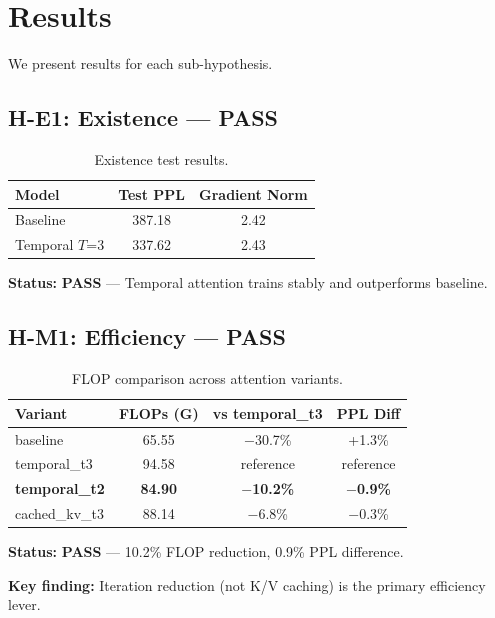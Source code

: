 \section{Results}
\label{sec:results}

We present results for each sub-hypothesis.

\subsection{H-E1: Existence --- PASS}

\begin{table}[h]
\centering
\begin{tabular}{@{}lcc@{}}
\toprule
\textbf{Model} & \textbf{Test PPL} & \textbf{Gradient Norm} \\
\midrule
Baseline & 387.18 & 2.42 \\
Temporal $T$=3 & 337.62 & 2.43 \\
\bottomrule
\end{tabular}
\caption{Existence test results.}
\label{tab:existence}
\end{table}

\textbf{Status:} \textbf{PASS} --- Temporal attention trains stably and outperforms baseline.

\subsection{H-M1: Efficiency --- PASS}

\begin{table}[h]
\centering
\begin{tabular}{@{}lccc@{}}
\toprule
\textbf{Variant} & \textbf{FLOPs (G)} & \textbf{vs temporal\_t3} & \textbf{PPL Diff} \\
\midrule
baseline & 65.55 & $-$30.7\% & +1.3\% \\
temporal\_t3 & 94.58 & reference & reference \\
\textbf{temporal\_t2} & \textbf{84.90} & \textbf{$-$10.2\%} & \textbf{$-$0.9\%} \\
cached\_kv\_t3 & 88.14 & $-$6.8\% & $-$0.3\% \\
\bottomrule
\end{tabular}
\caption{FLOP comparison across attention variants.}
\label{tab:efficiency}
\end{table}

\textbf{Status:} \textbf{PASS} --- 10.2\% FLOP reduction, 0.9\% PPL difference.

\textbf{Key finding:} Iteration reduction (not K/V caching) is the primary efficiency lever.

